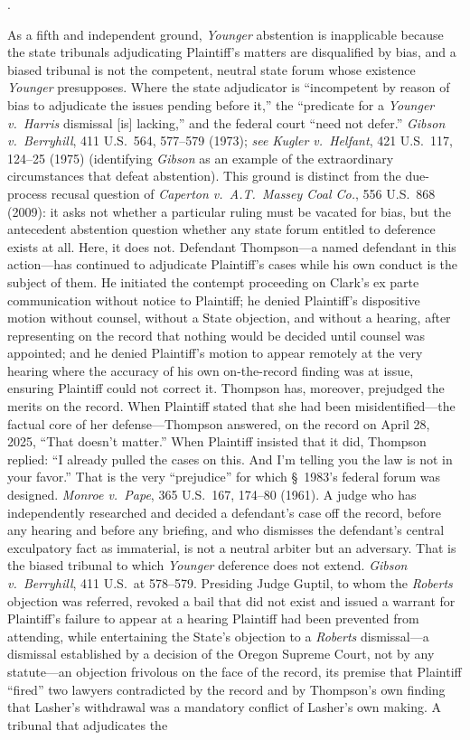 \documentclass[12pt,letterpaper]{article}
\newcounter{complaintpara}
\newenvironment{paras}{%
	\begin{list}{\arabic{complaintpara}.}{%
			\setlength{\leftmargin}{0.5in}%
			\setlength{\labelwidth}{0.4in}%
			\setlength{\labelsep}{0.1in}%
			\setlength{\itemsep}{0pt}%
			\setlength{\parsep}{0pt}%
			\setlength{\topsep}{6pt}%
		}%
	}{%
	\end{list}%
}
\newcommand{\sect}{§}
\begin{document}
\begin{paras}
		\item As a fifth and independent ground, \textit{Younger} abstention is inapplicable because the state tribunals adjudicating Plaintiff's matters are disqualified by bias, and a biased tribunal is not the competent, neutral state forum whose existence \textit{Younger} presupposes. Where the state adjudicator is ``incompetent by reason of bias to adjudicate the issues pending before it,'' the ``predicate for a \textit{Younger v.\ Harris} dismissal [is] lacking,'' and the federal court ``need not defer.'' \textit{Gibson v.\ Berryhill}, 411 U.S.\ 564, 577--579 (1973); \textit{see Kugler v.\ Helfant}, 421 U.S.\ 117, 124--25 (1975) (identifying \textit{Gibson} as an example of the extraordinary circumstances that defeat abstention). This ground is distinct from the due-process recusal question of \textit{Caperton v.\ A.T.\ Massey Coal Co.}, 556 U.S.\ 868 (2009): it asks not whether a particular ruling must be vacated for bias, but the antecedent abstention question whether any state forum entitled to deference exists at all. Here, it does not. Defendant Thompson---a named defendant in this action---has continued to adjudicate Plaintiff's cases while his own conduct is the subject of them. He initiated the contempt proceeding on Clark's ex parte communication without notice to Plaintiff; he denied Plaintiff's dispositive motion without counsel, without a State objection, and without a hearing, after representing on the record that nothing would be decided until counsel was appointed; and he denied Plaintiff's motion to appear remotely at the very hearing where the accuracy of his own on-the-record finding was at issue, ensuring Plaintiff could not correct it. Thompson has, moreover, prejudged the merits on the record. When Plaintiff stated that she had been misidentified---the factual core of her defense---Thompson answered, on the record on April 28, 2025, ``That doesn't matter.'' When Plaintiff insisted that it did, Thompson replied: ``I already pulled the cases on this. And I'm telling you the law is not in your favor.'' That is the very ``prejudice'' for which \sect\ 1983's federal forum was designed. \textit{Monroe v.\ Pape}, 365 U.S.\ 167, 174--80 (1961). A judge who has independently researched and decided a defendant's case off the record, before any hearing and before any briefing, and who dismisses the defendant's central exculpatory fact as immaterial, is not a neutral arbiter but an adversary. That is the biased tribunal to which \textit{Younger} deference does not extend. \textit{Gibson v.\ Berryhill}, 411 U.S.\ at 578--579. Presiding Judge Guptil, to whom the \textit{Roberts} objection was referred, revoked a bail that did not exist and issued a warrant for Plaintiff's failure to appear at a hearing Plaintiff had been prevented from attending, while entertaining the State's objection to a \textit{Roberts} dismissal---a dismissal established by a decision of the Oregon Supreme Court, not by any statute---an objection frivolous on the face of the record, its premise that Plaintiff ``fired'' two lawyers contradicted by the record and by Thompson's own finding that Lasher's withdrawal was a mandatory conflict of Lasher's own making. A tribunal that adjudicates the 
\end{paras}
\end{document}
